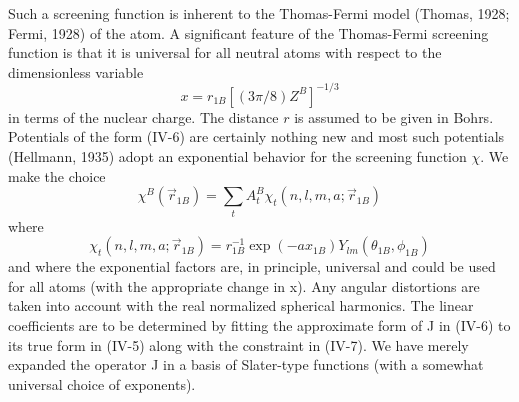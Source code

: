 \documentclass[12pt,letterpaper]{report}
\begin{document}
Such a screening function is inherent to the Thomas-Fermi model (Thomas, 1928; Fermi, 1928) of the atom. A significant feature of the Thomas-Fermi screening function is that it is universal for all neutral atoms with respect to the dimensionless variable
\begin{equation}
x = r_{1B}[(3\pi/8)Z^B]^{-1/3}
\end{equation}
in terms of the nuclear charge. The distance $r$ is assumed to be given in Bohrs. Potentials of the form (IV-6) are certainly nothing new and most such potentials (Hellmann, 1935) adopt an exponential behavior for the screening function $\chi$. We make the choice
\begin{equation}
\chi^B(\vec{r}_{1B}) = \sum_t A_t^B \chi_t(n,l,m,a;\vec{r}_{1B})
\end{equation}
where
\begin{equation}
\chi_t(n,l,m,a;\vec{r}_{1B}) = r_{1B}^{-1} \exp(-ax_{1B}) Y_{lm}(\theta_{1B}, \phi_{1B})
\end{equation}
and where the exponential factors are, in principle, universal and could be used for all atoms (with the appropriate change in x). Any angular distortions are taken into account with the real normalized spherical harmonics. The linear coefficients are to be determined by fitting the approximate form of J in (IV-6) to its true form in (IV-5) along with the constraint in (IV-7). We have merely expanded the operator J in a basis of Slater-type functions (with a somewhat universal choice of exponents).
\end{document}
